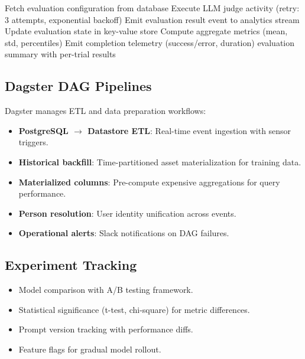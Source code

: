 \documentclass[11pt,letterpaper]{article}
\begin{document}
\begin{algorithm}[H]
\caption{LLM Evaluation Workflow}
\begin{algorithmic}[1]
\State Fetch evaluation configuration from database
  \State Execute LLM judge activity (retry: 3 attempts, exponential backoff)
  \State Emit evaluation result event to analytics stream
  \State Update evaluation state in key-value store
\EndFor
\State Compute aggregate metrics (mean, std, percentiles)
\State Emit completion telemetry (success/error, duration)
\State \Return evaluation summary with per-trial results
\end{algorithmic}
\end{algorithm}

\subsection{Dagster DAG Pipelines}

Dagster manages ETL and data preparation workflows:

\begin{itemize}
\item \textbf{PostgreSQL $\to$ Datastore ETL}: Real-time event ingestion with sensor triggers.
\item \textbf{Historical backfill}: Time-partitioned asset materialization for training data.
\item \textbf{Materialized columns}: Pre-compute expensive aggregations for query performance.
\item \textbf{Person resolution}: User identity unification across events.
\item \textbf{Operational alerts}: Slack notifications on DAG failures.
\end{itemize}

\subsection{Experiment Tracking}

\begin{itemize}
\item Model comparison with A/B testing framework.
\item Statistical significance (t-test, chi-square) for metric differences.
\item Prompt version tracking with performance diffs.
\item Feature flags for gradual model rollout.
\end{itemize}
\end{document}
